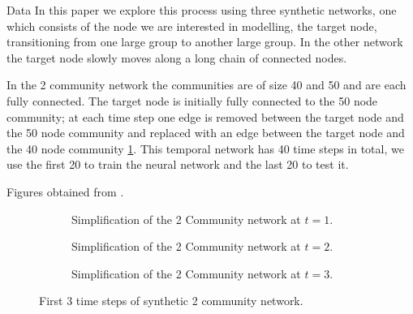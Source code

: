\documentclass{article}
\begin{document}
\begin{section}{Data}
    In this paper we explore this process using three synthetic networks, one which consists of the node we are interested in modelling, the target node, transitioning from one large group to another large group. In the other network the target node slowly moves along a long chain of connected nodes.

    In the 2 community network the communities are of size 40 and 50 and are each fully connected. The target node is initially fully connected to the 50 node community; at each time step one edge is removed between the target node and the 50 node community and replaced with an edge between the target node and the 40 node community \ref{2community train series}. This temporal network has 40 time steps in total, we use the first 20 to train the neural network and the last 20 to test it.

    Figures obtained from \cite{Emma2023}.
    \begin{figure}[H]
        \centering
        \centering
        \begin{subfigure}[c]{0.3\textwidth}
            \centering
            \resizebox{.6\width}{!}{}
            \caption{Simplification of the 2 Community network at $t=1$.}
        \end{subfigure}
        \hfill
        \centering
        \begin{subfigure}[c]{0.3\textwidth}
            \centering
            \resizebox{.6\width}{!}{}
            \caption{Simplification of the 2 Community network at $t=2$.}
        \end{subfigure}
        \hfill
        \centering
        \begin{subfigure}[c]{0.3\textwidth}
            \centering
            \resizebox{.6\width}{!}{}
            \caption{Simplification of the 2 Community network at $t=3$.}
        \end{subfigure}
        \caption{First 3 time steps of synthetic 2 community network.}
        \label{2community train series}
    \end{figure}


\end{section}
\end{document}
